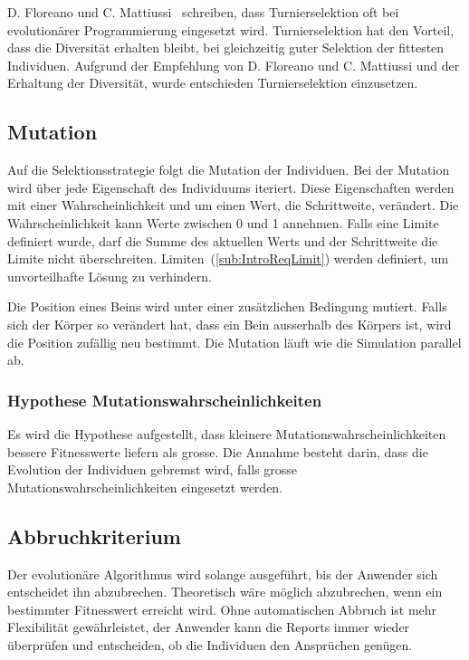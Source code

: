       D. Floreano und C. Mattiussi~\cite[S.33]{book:bioInspired} schreiben,
      dass Turnierselektion oft bei evolutionärer Programmierung eingesetzt wird.
      Turnierselektion hat den Vorteil, dass die Diversität erhalten bleibt,
      bei gleichzeitig guter Selektion der fittesten Individuen.
      Aufgrund der Empfehlung von D. Floreano und C. Mattiussi und der Erhaltung der Diversität,
      wurde entschieden Turnierselektion einzusetzen.

    \subsection{Mutation\label{sec:Mutation}}

      Auf die Selektionsstrategie folgt die Mutation der Individuen.
      Bei der Mutation wird über jede Eigenschaft des Individuums iteriert.
      Diese Eigenschaften werden mit einer Wahrscheinlichkeit und um einen Wert, die Schrittweite, verändert.
      Die Wahrscheinlichkeit kann Werte zwischen 0 und 1 annehmen.
      Falls eine Limite definiert wurde,
      darf die Summe des aktuellen Werts und der Schrittweite die Limite nicht überschreiten.
      Limiten~(\vref{sub:IntroReqLimit}) werden definiert, um unvorteilhafte Lösung zu verhindern.

      \medskip

      Die Position eines Beins wird unter einer zusätzlichen Bedingung mutiert. Falls sich der Körper so verändert hat,
      dass ein Bein ausserhalb des Körpers ist, wird die Position zufällig neu bestimmt.
      Die Mutation läuft wie die Simulation parallel ab.

      \subsubsection{Hypothese Mutationswahrscheinlichkeiten\label{subsub:hypoMut}}

        Es wird die Hypothese aufgestellt,
        dass kleinere Mutationswahrscheinlichkeiten bessere Fitnesswerte liefern als grosse.
        Die Annahme besteht darin, dass die Evolution der Individuen gebremst wird,
        falls grosse Mutationswahrscheinlichkeiten eingesetzt werden.

    \subsection{Abbruchkriterium}

      Der evolutionäre Algorithmus wird solange ausgeführt, bis der Anwender sich entscheidet ihn abzubrechen.
      Theoretisch wäre möglich abzubrechen, wenn ein bestimmter Fitnesswert erreicht wird.
      Ohne automatischen Abbruch ist mehr Flexibilität gewährleistet,
      der Anwender kann die Reports immer wieder überprüfen und entscheiden,
      ob die Individuen den Ansprüchen genügen.

